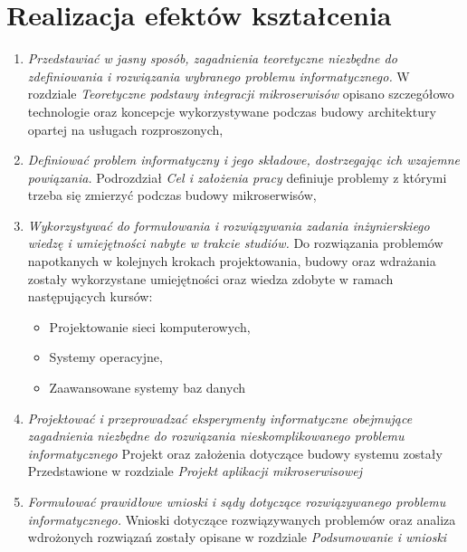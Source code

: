 \section{Realizacja efektów kształcenia}
\begin{enumerate}
    \item \textit{Przedstawiać w jasny sposób, zagadnienia teoretyczne niezbędne do zdefiniowania i rozwiązania wybranego problemu informatycznego.} W rozdziale \textit{Teoretyczne podstawy integracji mikroserwisów} opisano szczegółowo technologie oraz koncepcje wykorzystywane podczas budowy architektury opartej na usługach rozproszonych,
    \item \textit{ Definiować problem informatyczny i jego składowe, dostrzegając ich wzajemne powiązania.} Podrozdział \textit{Cel i założenia pracy} definiuje problemy z którymi trzeba się zmierzyć podczas budowy mikroserwisów,
    \item \textit{Wykorzystywać do formułowania i rozwiązywania zadania inżynierskiego wiedzę i umiejętności nabyte w trakcie studiów.} Do rozwiązania problemów napotkanych w kolejnych krokach projektowania, budowy oraz wdrażania zostały wykorzystane umiejętności oraz wiedza zdobyte w ramach następujących kursów:
    \begin{itemize}
        \item Projektowanie sieci komputerowych,
        \item Systemy operacyjne,
        \item Zaawansowane systemy baz danych
    \end{itemize}
    \item \textit{Projektować i przeprowadzać eksperymenty informatyczne obejmujące zagadnienia niezbędne do rozwiązania nieskomplikowanego problemu informatycznego} Projekt oraz założenia dotyczące budowy systemu zostały Przedstawione w rozdziale \textit{Projekt aplikacji mikroserwisowej}  
    \item \textit{Formułować prawidłowe wnioski i sądy dotyczące rozwiązywanego problemu informatycznego.} Wnioski dotyczące rozwiązywanych problemów oraz analiza wdrożonych rozwiązań zostały opisane w rozdziale \textit{Podsumowanie i wnioski}
\end{enumerate}